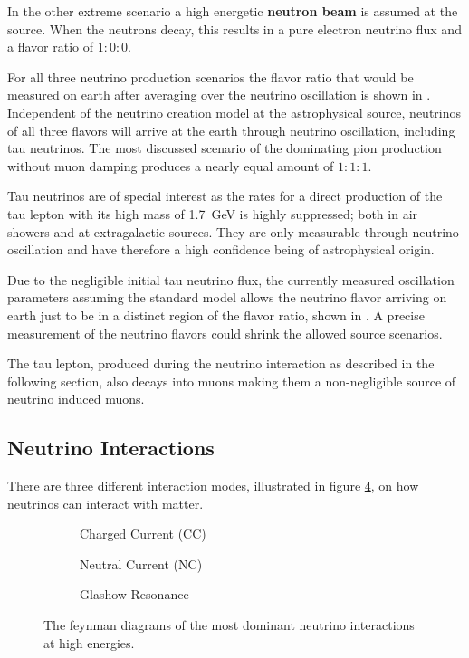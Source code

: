 In the other extreme scenario a high energetic \textbf{neutron beam} is assumed at the source.
When the neutrons decay, this results in a pure electron neutrino flux and a flavor ratio of $1:0:0$.

For all three neutrino production scenarios the flavor ratio that would be measured on earth after averaging over the neutrino oscillation is shown in .
Independent of the neutrino creation model at the astrophysical source, neutrinos of all three flavors will arrive at the earth through neutrino oscillation, including tau neutrinos.
The most discussed scenario of the dominating pion production without muon damping produces a nearly equal amount of $1:1:1$.

Tau neutrinos are of special interest as the rates for a direct production of the tau lepton with its high mass of \SI{1.7}{GeV} is highly suppressed; both in air showers and at extragalactic sources.
They are only measurable through neutrino oscillation and have therefore a high confidence being of astrophysical origin.

Due to the negligible initial tau neutrino flux, the currently measured oscillation parameters assuming the standard model allows the neutrino flavor arriving on earth just to be in a distinct region of the flavor ratio, shown in .
A precise measurement of the neutrino flavors could shrink the allowed source scenarios.

The tau lepton, produced during the neutrino interaction as described in the following section, also decays into muons making them a non-negligible source of neutrino induced muons.

\subsection{Neutrino Interactions}

There are three different interaction modes, illustrated in figure \ref{fig:feyn_nu}, on how neutrinos can interact with matter.
\begin{figure}
    \begin{subfigure}{0.31\textwidth}
        \centering
        
        \caption{Charged Current (CC)}
        \label{fig:feyn_nu_cc}
    \end{subfigure}
    \hfill
    \begin{subfigure}{0.31\textwidth}
        \centering
        
        \caption{Neutral Current (NC)}
        \label{fig:feyn_nu_nc}
    \end{subfigure}
    \hfill
    \begin{subfigure}{0.31\textwidth}
        \centering
        
        \caption{Glashow Resonance}
        \label{fig:feyn_glashow}
    \end{subfigure}
    \caption{The feynman diagrams of the most dominant neutrino interactions at high energies.}
    \label{fig:feyn_nu}
\end{figure}

